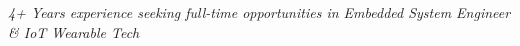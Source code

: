 




\begin{cvparagraph}

\centering
\textit{4+ Years experience seeking full-time opportunities in Embedded System Engineer \& IoT Wearable Tech
}
\end{cvparagraph}


